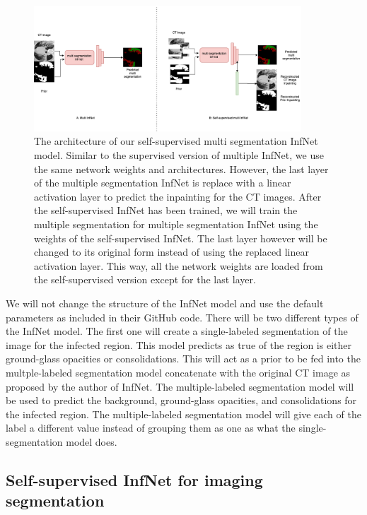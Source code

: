 \begin{figure}
	\centering
	\includegraphics[width=100mm]{self-super-multi-inf-net.png}
	\caption{The architecture of our self-supervised multi segmentation InfNet model. Similar to the supervised version of multiple InfNet, we use the same network weights and architectures. However, the last layer of the multiple segmentation InfNet is replace with a linear activation layer to predict the inpainting for the CT images. After the self-supervised InfNet has been trained, we will train the multiple segmentation for multiple segmentation InfNet using the weights of the self-supervised InfNet.  The last layer however will be changed to its original form instead of using the replaced linear activation layer.  This way, all the network weights are loaded from the self-supervised version except for the last layer.}
	\label{fig:multi-inf-net_arch}
\end{figure}

We will not change the structure of the InfNet model and use the default parameters as included in their GitHub code. There will be two different types of the InfNet model. The first one will create a single-labeled segmentation of the image for the infected region. This model predicts as true of the region is either ground-glass opacities or consolidations. This will act as a prior to be fed into the multple-labeled segmentation model concatenate with the original CT image as proposed by the author of InfNet. The multiple-labeled segmentation model will be used to predict the background, ground-glass opacities, and consolidations for the infected region. The multiple-labeled segmentation model will give each of the label a different value instead of grouping them as one as what the single-segmentation model does. 

\subsection{Self-supervised InfNet for imaging segmentation}

